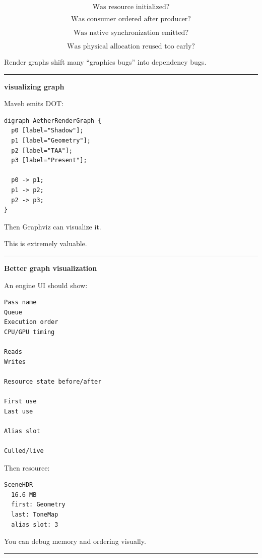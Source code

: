 \[
\boxed{
\text{Was resource initialized?}
}
\]

\[
\boxed{
\text{Was consumer ordered after producer?}
}
\]

\[
\boxed{
\text{Was native synchronization emitted?}
}
\]

\[
\boxed{
\text{Was physical allocation reused too early?}
}
\]

Render graphs shift many ``graphics bugs'' into dependency bugs.

\begin{center}\rule{0.5\linewidth}{0.5pt}\end{center}

\textbf{visualizing graph}

Maveb emits DOT:

\begin{verbatim}
digraph AetherRenderGraph {
  p0 [label="Shadow"];
  p1 [label="Geometry"];
  p2 [label="TAA"];
  p3 [label="Present"];

  p0 -> p1;
  p1 -> p2;
  p2 -> p3;
}
\end{verbatim}

Then Graphviz can visualize it.

This is extremely valuable.

\begin{center}\rule{0.5\linewidth}{0.5pt}\end{center}

\textbf{Better graph visualization}

An engine UI should show:

\begin{verbatim}
Pass name
Queue
Execution order
CPU/GPU timing

Reads
Writes

Resource state before/after

First use
Last use

Alias slot

Culled/live
\end{verbatim}

Then resource:

\begin{verbatim}
SceneHDR
  16.6 MB
  first: Geometry
  last: ToneMap
  alias slot: 3
\end{verbatim}

You can debug memory and ordering visually.

\begin{center}\rule{0.5\linewidth}{0.5pt}\end{center}

